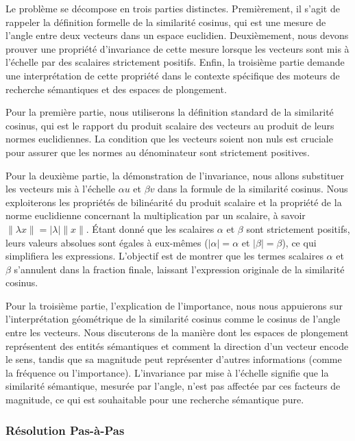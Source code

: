 \documentclass[11pt,a4paper]{report}
\begin{document}
Le problème se décompose en trois parties distinctes. Premièrement, il
s'agit de rappeler la définition formelle de la similarité cosinus, qui
est une mesure de l'angle entre deux vecteurs dans un espace euclidien.
Deuxièmement, nous devons prouver une propriété d'invariance de cette
mesure lorsque les vecteurs sont mis à l'échelle par des scalaires
strictement positifs. Enfin, la troisième partie demande une
interprétation de cette propriété dans le contexte spécifique des
moteurs de recherche sémantiques et des espaces de plongement.

Pour la première partie, nous utiliserons la définition standard de la
similarité cosinus, qui est le rapport du produit scalaire des vecteurs
au produit de leurs normes euclidiennes. La condition que les vecteurs
soient non nuls est cruciale pour assurer que les normes au dénominateur
sont strictement positives.

Pour la deuxième partie, la démonstration de l'invariance, nous allons
substituer les vecteurs mis à l'échelle \(\alpha u\) et \(\beta v\) dans
la formule de la similarité cosinus. Nous exploiterons les propriétés de
bilinéarité du produit scalaire et la propriété de la norme euclidienne
concernant la multiplication par un scalaire, à savoir
\(\| \lambda x \| = |\lambda| \|x\|\). Étant donné que les scalaires
\(\alpha\) et \(\beta\) sont strictement positifs, leurs valeurs
absolues sont égales à eux-mêmes (\(|\alpha|=\alpha\) et
\(|\beta|=\beta\)), ce qui simplifiera les expressions. L'objectif est
de montrer que les termes scalaires \(\alpha\) et \(\beta\) s'annulent
dans la fraction finale, laissant l'expression originale de la
similarité cosinus.

Pour la troisième partie, l'explication de l'importance, nous nous
appuierons sur l'interprétation géométrique de la similarité cosinus
comme le cosinus de l'angle entre les vecteurs. Nous discuterons de la
manière dont les espaces de plongement représentent des entités
sémantiques et comment la direction d'un vecteur encode le sens, tandis
que sa magnitude peut représenter d'autres informations (comme la
fréquence ou l'importance). L'invariance par mise à l'échelle signifie
que la similarité sémantique, mesurée par l'angle, n'est pas affectée
par ces facteurs de magnitude, ce qui est souhaitable pour une recherche
sémantique pure.

\hypertarget{ruxe9solution-pas-uxe0-pas}{%
\subsubsection{Résolution Pas-à-Pas}\label{ruxe9solution-pas-uxe0-pas}}
\end{document}
